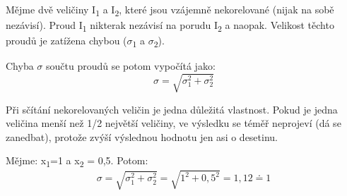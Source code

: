 Mějme dvě veličiny I\textsubscript{1} a I\textsubscript{2}, které jsou vzájemně nekorelované (nijak na sobě nezávisí). Proud I\textsubscript{1} nikterak nezávisí na porudu I\textsubscript{2} a naopak. Velikost těchto proudů je zatížena chybou ($\sigma$\textsubscript{1} a $\sigma$\textsubscript{2}).

Chyba $\sigma$ součtu proudů se potom vypočítá jako:
\begin{equation}
\sigma = \sqrt{\sigma_{1}^{2}+\sigma_{2}^{2}}
\end{equation}

Při sčítání nekorelovaných veličin je jedna důležitá vlastnost. Pokud je jedna veličina menší než 1/2 největší veličiny, ve výsledku se téměř neprojeví (dá se zanedbat), protože zvýší výslednou hodnotu jen asi o desetinu.

Mějme: x\textsubscript{1}=1 a x\textsubscript{2} = 0,5. Potom:
\begin{equation}
\sigma = \sqrt{\sigma_{1}^{2}+\sigma_{2}^{2}}=\sqrt{1^{2}+0,5^{2}}=1,12\doteq 1
\end{equation}
